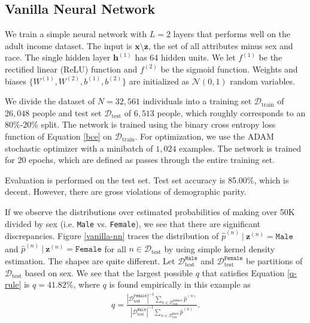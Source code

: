 \documentclass{article}
\newcommand\given[1][]{\:#1\vert\:}
\newcommand{\bd}[1]{\boldsymbol{#1}}
\newcommand{\hp}{\hat{p}}
\newcommand{\idx}[3][]{{#2}^{(#3)}_{#1}}
\newcommand{\bidx}[3][]{\bd{#2}^{(#3)}_{#1}}
\begin{document}
\subsection{Vanilla Neural Network} \label{vanilla-net}

We train a simple neural network with $L = 2$ layers that performs well on the adult income dataset.  The input is $\bd x \setminus \bd z$, the set of all attributes minus sex and race.  The single hidden layer $\bidx h 1$ has 64 hidden units.  We let $\idx f 1$ be the rectified linear (ReLU) function and $\idx f 2$ be the sigmoid function.  Weights and biases $\{\idx W 1, \idx W 2, \idx b 1, \idx b 2\}$ are initialized as $\mathcal{N}(0, 1)$ random variables.  

We divide the dataset of $N = 32,561$ individuals into a training set $\mathcal{D}_\text{train}$ of $26,048$ people and test set $\mathcal{D}_\text{test}$ of $6,513$ people, which roughly corresponds to an 80\%-20\% split.  The network is trained using the binary cross entropy loss function of Equation \ref{bce} on $\mathcal{D}_\text{train}$.  For optimization, we use the ADAM stochastic optimizer \citep{kingma2014adam} with a minibatch of $1,024$ examples.  The network is trained for 20 epochs, which are defined as passes through the entire training set.   

Evaluation is performed on the test set.  Test set accuracy is 85.00\%, which is decent.  However, there are gross violations of demographic parity.  

If we observe the distributions over estimated probabilities of making over 50K divided by sex (i.e. \texttt{Male} vs. \texttt{Female}), we see that there are significant discrepancies.  Figure \ref{vanilla-nn} traces the distribution of $\idx \hp n \given \bidx z n = \texttt{Male}$ and $\idx \hp n \given \bidx z n = \texttt{Female}$ for all $n \in \mathcal{D}_\text{test}$ by using simple kernel density estimation.  The shapes are quite different.  Let $\mathcal{D}_\text{test}^\texttt{Male}$ and $\mathcal{D}_\text{test}^\texttt{Female}$ be partitions of $\mathcal{D}_\text{test}$ based on sex.  We see that the largest possible $q$ that satisfies Equation \ref{q-rule} is $q = 41.82\%$, where $q$ is found empirically in this example as 
\begin{align}
q = \frac{| \mathcal{D}_\text{test}^\texttt{Female} |^{-1} \sum_{n \in \mathcal{D}_\text{test}^\texttt{Female}} \idx \hp n}{| \mathcal{D}_\text{test}^\texttt{Male} |^{-1} \sum_{n \in \mathcal{D}_\text{test}^\texttt{Male}} \idx \hp n}.
\end{align} 
\end{document}
